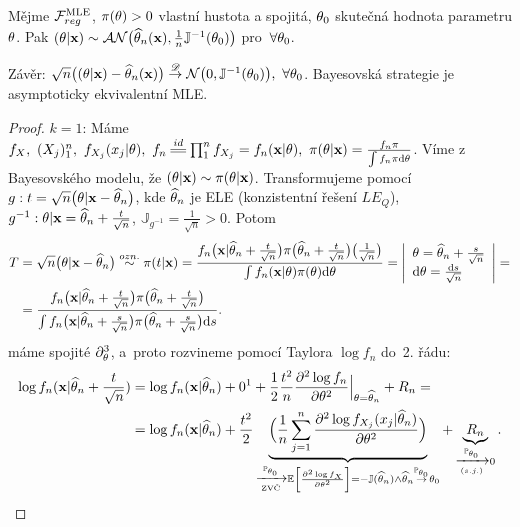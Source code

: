 \begin{dusl}
	Mějme $\mathcal{F}_{reg}^{\mathrm{{\footnotesize MLE }}}$, $\pi(\theta)>0$ vlastní hustota a spojitá, $\theta_0$ skutečná hodnota parametru $\theta$. Pak $(\theta|\textbf{x})\sim\mathcal{AN}\big(\widehat{\theta}_n(\textbf{x}),\frac{1}{n}\mathbb{J}^{-1}(\theta_0)\big)$ pro~$\forall\theta_0$.
	
	Závěr: $\sqrt{n}\big( (\theta|\textbf{x})-\widehat{\theta}_n(\textbf{x}) \big)\stackrel{\mathscr{D}}{\to} \mathcal{N}\big( 0,\mathbb{J}^{-1}(\theta_0) \big),~\forall\theta_0$. Bayesovská strategie je asymptoticky ekvivalentní MLE.
	\begin{proof}
		$k=1$: Máme $f_{X},~(X_j)_1^n,~f_{X_j}(x_j|\t),~f_n\equal{id}\prod_1^n f_{X_j}=f_n(\textbf{x}|\t),~\pi(\t|\textbf{x})=\frac{f_n \pi}{\int f_n \pi\d\t}$. Víme z Bayesovského modelu, že $(\theta|\textbf{x})\sim\pi(\theta|\textbf{x})$. Transformujeme pomocí $g: t=\sqrt{n}\big( \theta|\textbf{x}-\widehat{\theta}_n \big)$, kde $\widehat{\theta}_n$ je ELE (konzistentní řešení $LE_Q$), $g^{-1}:\theta|\textbf{x}=\widehat{\theta}_n + \frac{t}{\sqrt{n}}$, $\mathbb{J}_{g^{-1}}=\frac{1}{\sqrt{n}}>0$. Potom
		\[
		\begin{split}
		T&=\sqrt{n}\big(\theta|\textbf{x}-\widehat{\theta}_n\big)\stackrel{ozn.}{\sim}\pi(t|\textbf{x})=\frac{f_n\big(\textbf{x}|\widehat{\theta}_n+\frac{t}{\sqrt{n}}\big)\pi\big( \widehat{\theta}_n+\frac{t}{\sqrt{n}} \big)\big(\frac{1}{\sqrt{n}}\big)}{\int f_n(\textbf{x}|\theta)\pi(\theta)\mathrm{d}\theta}=\left|\begin{array}{l}
		\theta=\widehat{\theta}_n+\frac{s}{\sqrt{n}}\\\mathrm{d}\theta=\frac{\mathrm{d} s}{\sqrt{n}}\end{array}
		\right|=\\ &=\frac{f_n\big(\textbf{x}|\widehat{\theta}_n+\frac{t}{\sqrt{n}}\big)\pi\big( \widehat{\theta}_n+\frac{t}{\sqrt{n}} \big)}{\int f_n\big(\textbf{x}|\widehat{\theta}_n+\frac{s}{\sqrt{n}}\big)\pi\big( \widehat{\theta}_n+\frac{s}{\sqrt{n}} \big)\mathrm{d} s}.
		\end{split}
		\]
		máme spojité $\partial_\theta^3$, a~proto rozvineme pomocí Taylora $\log f_n$ do~2. řádu:
		\[
		\begin{split}
		\log f_n(\textbf{x}|\htn+\frac{t}{\sqrt{n}})&=\log f_n(\textbf{x}|\htn)+0\text{\footnotemark}+\frac{1}{2}\frac{t^2}{n}\frac{\partial^2 \log f_n}{\partial\t^2}\Big|_{\t=\htn}+R_n=\\&=\log f_n(\textbf{x}|\htn)+\frac{t^2}{2}\underbrace{\Big( \frac{1}{n}\sumjn \frac{\partial^2 \log f_{X_j}(x_j|\htn)}{\partial\t^2} \Big)}_{\xrightarrow[\text{ZVČ}]{\PP_{\t_0}}\EE{\frac{\partial^2\log f_X}{\partial\t^2}}=-\mathbb{J}(\htn)\wedge \htn \stackrel{\PP_{\t_0}}{\rightarrow} \t_0}+\underbrace{R_n}_{\xrightarrow[(s.j.)]{\PP_{\t_0}}0}.
		\end{split}
		\]

\end{proof}
\end{dusl}
